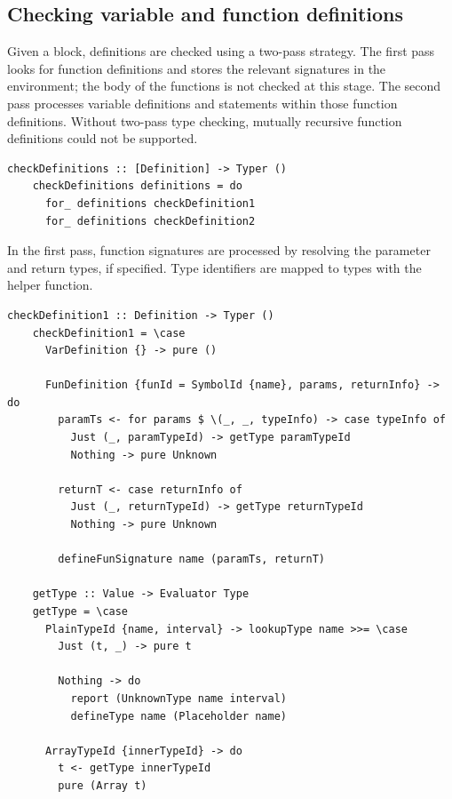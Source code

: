 \documentclass[UdineBachThesis,american,11pt]{PhdThesis}
\begin{document}
  \subsection{Checking variable and function definitions}

  Given a block, definitions are checked using a two-pass strategy. The first
  pass looks for function definitions and stores the relevant signatures in the
  environment; the body of the functions is not checked at this stage. The
  second pass processes variable definitions and statements within those
  function definitions. Without two-pass type checking, mutually recursive
  function definitions could not be supported.

  \begin{lstlisting}[gobble=4,basicstyle=\ttfamily\small]
    checkDefinitions :: [Definition] -> Typer ()
    checkDefinitions definitions = do
      for_ definitions checkDefinition1
      for_ definitions checkDefinition2
  \end{lstlisting}

  In the first pass, function signatures are processed by resolving the
  parameter and return types, if specified. Type identifiers are mapped to types
  with the \lstinline@getType@ helper function.

  \begin{lstlisting}[gobble=4,basicstyle=\ttfamily\small]
    checkDefinition1 :: Definition -> Typer ()
    checkDefinition1 = \case
      VarDefinition {} -> pure ()

      FunDefinition {funId = SymbolId {name}, params, returnInfo} -> do
        paramTs <- for params $ \(_, _, typeInfo) -> case typeInfo of
          Just (_, paramTypeId) -> getType paramTypeId
          Nothing -> pure Unknown

        returnT <- case returnInfo of
          Just (_, returnTypeId) -> getType returnTypeId
          Nothing -> pure Unknown

        defineFunSignature name (paramTs, returnT)

    getType :: Value -> Evaluator Type
    getType = \case
      PlainTypeId {name, interval} -> lookupType name >>= \case
        Just (t, _) -> pure t

        Nothing -> do
          report (UnknownType name interval)
          defineType name (Placeholder name)

      ArrayTypeId {innerTypeId} -> do
        t <- getType innerTypeId
        pure (Array t)
  \end{lstlisting}
\end{document}
